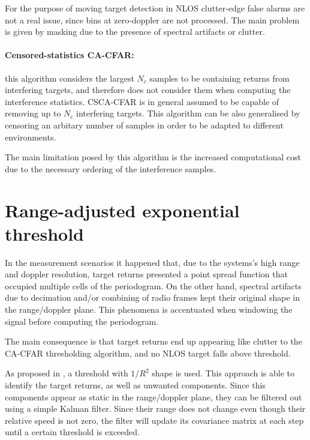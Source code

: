 For the purpose of moving target detection in NLOS clutter-edge false alarms are not a real issue, since bins at zero-doppler are not processed.
 The main problem is given by masking due to the presence of spectral artifacts or clutter.
 
 
\paragraph{Censored-statistics CA-CFAR:}
this algorithm considers the largest $N_c$ samples to be containing returns from interfering targets, and therefore does not consider them when computing the interference statistics. CSCA-CFAR is in general assumed to be capable of removing up to $N_c$ interfering targets.
This algorithm can be also generalised by censoring an arbitary number of samples in order to be adapted to different environments. 

The main limitation posed by this algorithm is the increased computational cost due to the necessary ordering of the interference samples.


\section{Range-adjusted exponential threshold}

In the measurement scenarios it happened that, due to the systems's high range and doppler resolution, target returns presented a point spread function that occupied multiple cells of the periodogram. On the other hand, spectral artifacts due to decimation and/or combining of radio frames kept their original shape in the range/doppler plane. This phenomena is accentuated when windowing the signal before computing the periodogram.

The main consequence is that target returns end up appearing like clutter to the CA-CFAR thresholding algorithm, and no NLOS target falls above threshold.

As proposed in \cite{Wagner_Feger_Stelzer_2017}, a threshold with $1/R^2$ shape is used. This approach is able to identify the target returns, as well as unwanted components. Since this components appear as static in the range/doppler plane, they can be filtered out using a simple Kalman filter. Since their range does not change even though their relative speed is not zero, the filter will update its covariance matrix at each step until a certain threshold is exceeded.





